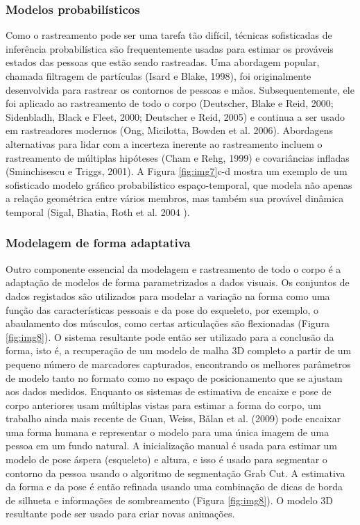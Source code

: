 \documentclass{article}
\begin{document}
\subsubsection{Modelos probabilísticos}
Como o rastreamento pode ser uma tarefa tão difícil, técnicas sofisticadas de inferência probabilística são frequentemente usadas para estimar os prováveis estados das pessoas que estão sendo rastreadas. Uma abordagem popular, chamada filtragem de partículas (Isard e Blake, 1998), foi originalmente desenvolvida para rastrear os contornos de pessoas e mãos. Subsequentemente, ele foi aplicado ao rastreamento de todo o corpo (Deutscher, Blake e Reid, 2000; Sidenbladh, Black e Fleet, 2000; Deutscher e Reid, 2005) e continua a ser usado em rastreadores modernos (Ong, Micilotta, Bowden et al. 2006). Abordagens alternativas para lidar com a incerteza inerente ao rastreamento incluem o rastreamento de múltiplas hipóteses (Cham e Rehg, 1999) e covariâncias infladas (Sminchisescu e Triggs, 2001). A Figura \ref{fig:img7}c-d mostra um exemplo de um sofisticado modelo gráfico probabilístico espaço-temporal, que modela não apenas a relação geométrica entre vários membros, mas também sua provável dinâmica temporal (Sigal, Bhatia, Roth et al. 2004 ).

\subsubsection{Modelagem de forma adaptativa}
Outro componente essencial da modelagem e rastreamento de todo o corpo é a adaptação de modelos de forma parametrizados a dados visuais. Os conjuntos de dados registados são utilizados para modelar a variação na forma como uma função das características pessoais e da pose do esqueleto, por exemplo, o abaulamento dos músculos, como certas articulações são flexionadas (Figura \ref{fig:img8}). O sistema resultante pode então ser utilizado para a conclusão da forma, isto é, a recuperação de um modelo de malha 3D completo a partir de um pequeno número de marcadores capturados, encontrando os melhores parâmetros de modelo tanto no formato como no espaço de posicionamento que se ajustam aos dados medidos. Enquanto os sistemas de estimativa de encaixe e pose de corpo anteriores usam múltiplas vistas para estimar a forma do corpo, um trabalho ainda mais recente de Guan, Weiss, Bǎlan et al. (2009) pode encaixar uma forma humana e representar o modelo para uma única imagem de uma pessoa em um fundo natural. A inicialização manual é usada para estimar um modelo de pose áspera (esqueleto) e altura, e isso é usado para segmentar o contorno da pessoa usando o algoritmo de segmentação Grab Cut. A estimativa da forma e da pose é então refinada usando uma combinação de dicas de borda de silhueta e informações de sombreamento (Figura \ref{fig:img8}). O modelo 3D resultante pode ser usado para criar novas animações.
\end{document}
